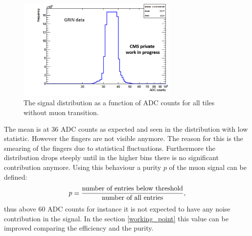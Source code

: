 			\begin{figure}[htbp]
				\centering
				\includegraphics[width=0.70\textwidth]{Figures/erdogan/noise_high.png}
				\caption{The signal distribution as a function of ADC counts for all tiles without muon transition.}
				\label{fig:noise_high}
			\end{figure}
			The mean is at 36 ADC counts as expected and seen in the distribution with low statistic.
			However the fingers are not visible anymore.
			The reason for this is the smearing of the fingers due to statistical fluctuations.
			Furthermore the distribution drops steeply until in the higher bins there is no significant contribution anymore.
			Using this behaviour a purity $p$ of the muon signal can be defined:
			\begin{equation}
				p = \frac{\textnormal{number of entries below threshold}}{\textnormal{number of all entries}},
			\end{equation}
			thus above 60 ADC counts for instance it is not expected to have any noise contribution in the signal.
			In the section \ref{working_point} this value can be improved comparing the efficiency and the purity.
